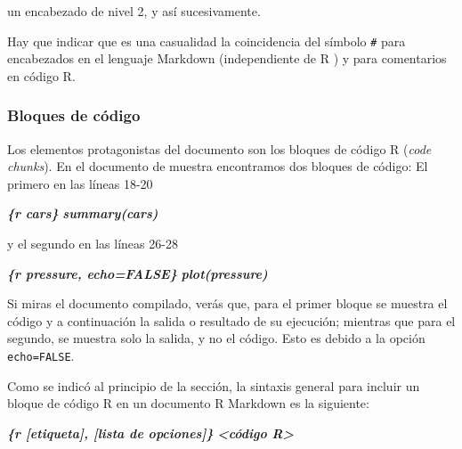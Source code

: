 \documentclass[
  degree=mecinf,
  title=normal,
  toc=normal,
  bib=normal]{mnye}
\newenvironment{Shaded}{\begin{snugshade}}{\end{snugshade}}
\newcommand{\InformationTok}[1]{\textcolor[rgb]{0.56,0.35,0.01}{\textbf{\textit{#1}}}}
\begin{document}
un encabezado de nivel 2, y así sucesivamente.

Hay que indicar que es una casualidad la coincidencia del símbolo \texttt{\#} para encabezados en el lenguaje Markdown (independiente de \textsf{R} ) y para comentarios en código \textsf{R}.

\hypertarget{bloques-de-cuxf3digo}{%
\subsubsection{Bloques de código}\label{bloques-de-cuxf3digo}}

Los elementos protagonistas del documento son los bloques de código \textsf{R} (\emph{code chunks}). En el documento de muestra encontramos dos bloques de código: El primero en las líneas 18-20

\begin{Shaded}
\begin{Highlighting}[]
\InformationTok{\textasciigrave{}\textasciigrave{}\textasciigrave{}\{r cars\}}
\InformationTok{summary(cars)}
\InformationTok{\textasciigrave{}\textasciigrave{}\textasciigrave{}}
\end{Highlighting}
\end{Shaded}

y el segundo en las líneas 26-28

\begin{Shaded}
\begin{Highlighting}[]
\InformationTok{\textasciigrave{}\textasciigrave{}\textasciigrave{}\{r pressure, echo=FALSE\}}
\InformationTok{plot(pressure)}
\InformationTok{\textasciigrave{}\textasciigrave{}\textasciigrave{}}
\end{Highlighting}
\end{Shaded}

Si miras el documento compilado, verás que, para el primer bloque se muestra el código y a continuación la salida o resultado de su ejecución; mientras que para el segundo, se muestra solo la salida, y no el código. Esto es debido a la opción \texttt{echo=FALSE}.

Como se indicó al principio de la sección, la sintaxis general para incluir un bloque de código \textsf{R} en un documento R Markdown es la siguiente:

\begin{Shaded}
\begin{Highlighting}[]
\InformationTok{\textasciigrave{}\textasciigrave{}\textasciigrave{}\{r [etiqueta], [lista de opciones]\}}
\InformationTok{\textless{}código R\textgreater{}}
\InformationTok{\textasciigrave{}\textasciigrave{}\textasciigrave{}}
\end{Highlighting}
\end{Shaded}
\end{document}
